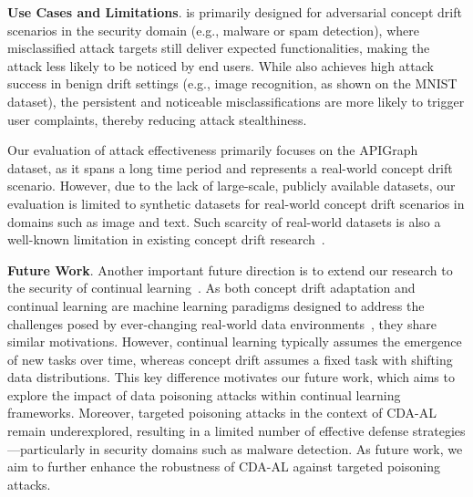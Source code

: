 \textbf{Use Cases and Limitations}.
\pandora is primarily designed for adversarial concept drift scenarios in the security domain (e.g., malware or spam detection), where misclassified attack targets still deliver expected functionalities, making the attack less likely to be noticed by end users.
While \pandora also achieves high attack success in benign drift settings (e.g., image recognition, as shown on the MNIST dataset), the persistent and noticeable misclassifications are more likely to trigger user complaints, thereby reducing attack stealthiness.

Our evaluation of attack effectiveness primarily focuses on the APIGraph~\cite{2020-CCS-APIGraph} dataset, as it spans a long time period and represents a real-world concept drift scenario.
However, due to the lack of large-scale, publicly available datasets, our evaluation is limited to synthetic datasets for real-world concept drift scenarios in domains such as image and text.
Such scarcity of real-world datasets is also a well-known limitation in existing concept drift research~\cite{ganguly2023online,2023-Usenix-chenyizhen,2021-Usenix-CDAE}.

\textbf{Future Work}.
Another important future direction is to extend our research to the security of continual learning~\cite{han2023data,guo2024persistent}.
As both concept drift adaptation and continual learning are machine learning paradigms designed to address the challenges posed by ever-changing real-world data environments~\cite{wang2024comprehensive}, they share similar motivations. 
However, continual learning typically assumes the emergence of new tasks over time, whereas concept drift assumes a fixed task with shifting data distributions.
This key difference motivates our future work, which aims to explore the impact of data poisoning attacks within continual learning frameworks.
Moreover, targeted poisoning attacks in the context of CDA-AL remain underexplored, resulting in a limited number of effective defense strategies—particularly in security domains such as malware detection.
As future work, we aim to further enhance the robustness of CDA-AL against targeted poisoning attacks.

\noindent 